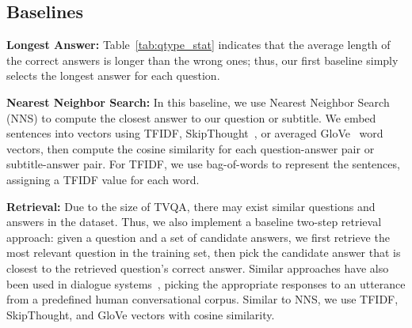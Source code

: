 \documentclass[11pt,a4paper]{article}
\begin{document}
\subsection{Baselines}

\noindent\textbf{Longest Answer:} Table~\ref{tab:qtype_stat} indicates that the average length of the correct answers is longer than the wrong ones; thus, our first baseline simply selects the longest answer for each question.


\noindent\textbf{Nearest Neighbor Search:} 
In this baseline, we use Nearest Neighbor Search (NNS) to compute the closest answer to our question or subtitle.
We embed sentences into vectors using TFIDF, SkipThought~\cite{Kiros2015SkipThoughtV}, or averaged GloVe~\citep{Pennington2014GloveGV} word vectors, then compute the cosine similarity for each question-answer pair or subtitle-answer pair.
For TFIDF, we use bag-of-words to represent the sentences, assigning a TFIDF value for each word.

\noindent\textbf{Retrieval:} 
Due to the size of TVQA, there may exist similar questions and answers in the dataset. Thus, we also implement a baseline two-step retrieval approach: 
given a question and a set of candidate answers, we first retrieve the most relevant question in the training set, then pick the candidate answer that is closest to the retrieved question's correct answer. 
Similar approaches have also been used in dialogue systems~\citep{Jafarpour2010FilterRA, Leuski2011NPCEditorCV}, picking the appropriate responses to an utterance from a predefined human conversational corpus. 
Similar to NNS, we use TFIDF, SkipThought, and GloVe vectors with cosine similarity.
\end{document}
